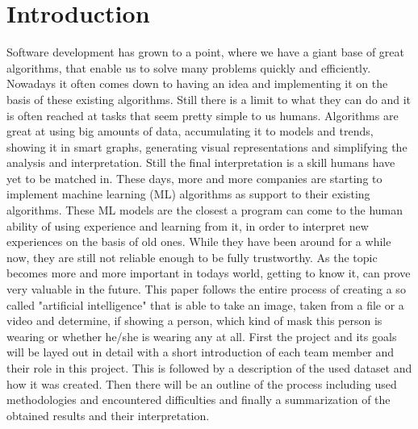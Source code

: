 \section{Introduction}

Software development has grown to a point, where we have a giant base of great
algorithms, that enable us to solve many problems quickly and efficiently. Nowadays
it often comes down to having an idea and implementing it on the basis of these
existing algorithms. Still there is a
limit to what they can do and it is often reached at tasks that seem pretty
simple to us humans. Algorithms are great at using big amounts of data,
accumulating it to models and trends, showing it in smart graphs, generating
visual representations and simplifying the analysis and interpretation. Still
the final interpretation is a skill humans have yet to be matched in.
\newline
These days, more and more companies are starting to implement machine learning
(ML) algorithms as support to their existing algorithms. These ML models are
the closest a program can come to the human ability of using experience and learning
from it, in order to interpret new experiences on the basis of old ones.
While they have been around for a while now, they are still not reliable enough
to be fully trustworthy. As the topic becomes more and more important in
todays world, getting to know it, can prove very valuable in the future.
\newline
This paper follows the entire process of creating a so called "artificial
intelligence" that is able to take an image, taken from a file or a video and
determine, if showing a person, which kind of mask this person is wearing or
whether he/she is wearing any at all. First the project and its goals will be
layed out in detail with a short introduction of each team member and their role
in this project. This is followed by a description of the used dataset and how
it was created. Then there will be an outline of the process including used
methodologies and encountered difficulties and finally a summarization of the
obtained results and their interpretation. 